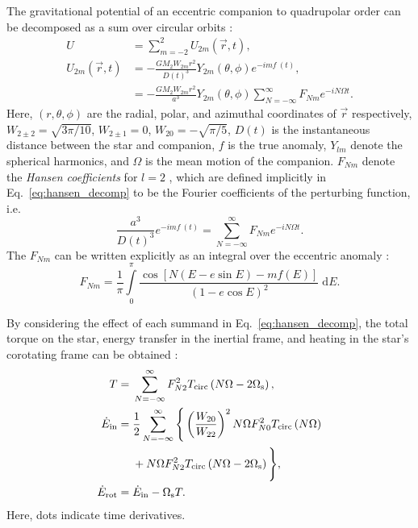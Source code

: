 \documentclass[
        fleqn,
        usenatbib,
    ]{mnras}
\newcommand*{\p}[1]{\left(#1\right)}
\newcommand*{\s}[1]{\left[#1\right]}
\begin{document}
The gravitational potential of an eccentric companion to quadrupolar order can
be decomposed as a sum over circular orbits \citep[e.g.][]{sl,vlf}:
\begin{align}
    U &= \sum\limits_{m=-2}^2 U_{2m} \p{\vec{r}, t},\label{eq:u_ecc}\\
    U_{2m}\p{\vec{r}, t} &= -\frac{GM_2 W_{2m} r^2}{D(t)^3}
        Y_{2m}(\theta, \phi) e^{-imf\!\!\!\:(t)},\nonumber\\
        &= -\frac{GM_2W_{2m} r^2}{a^3}Y_{2m}\p{\theta, \phi}
            \sum\limits_{N = -\infty}^\infty \!\!F_{Nm}e^{-iN\Omega t}
            \label{eq:hansen_decomp}.
\end{align}
Here, $(r, \theta, \phi)$ are the radial, polar, and azimuthal coordinates of
$\vec{r}$ respectively, $W_{2 \pm 2} = \sqrt{3\pi/10}$, $W_{2 \pm 1} = 0$,
$W_{20} = -\sqrt{\pi / 5}$, $D(t)$ is the instantaneous distance between the
star and companion, $f$ is the true anomaly, $Y_{lm}$ denote the spherical
harmonics, and $\Omega$ is the mean motion of the companion. $F_{Nm}$ denote
the \emph{Hansen coefficients} for $l = 2$ \citep[also denoted $X^n_{2m}$
in][]{murray1999solar}, which are defined implicitly in
Eq.~\eqref{eq:hansen_decomp} to be the Fourier coefficients of the perturbing
function, i.e.
\begin{equation}
    \frac{a^3}{D(t)^3} e^{-imf\!\!\!\:(t)} = \sum\limits_{N = -\infty}^\infty
        \!\!F_{Nm} e^{-iN\Omega t}.\label{eq:hansen_series}
\end{equation}
The $F_{Nm}$ can be written explicitly as an integral over the eccentric anomaly
\citep{murray1999solar, sl}:
\begin{equation}
    F_{Nm} = \frac{1}{\pi}\int\limits_{0}^{\pi}
        \frac{\cos\s{N\p{E - e\sin E} - mf(E)}}
            {\p{1 - e\cos E}^2}\;\mathrm{d}E.\label{eq:hansen_integral}
\end{equation}

By considering the effect of each summand in Eq.~\eqref{eq:hansen_decomp}, the
total torque on the star, energy transfer in the inertial frame, and heating in
the star's corotating frame can be obtained \citep{sl, vlf}:
\begin{align}
    T ={}& \sum\limits_{N = -\infty}^\infty F_{N2}^2
        T_{\rm circ}\p{N\Omega - 2\Omega_{\rm s}},\label{eq:tau_sum}
        \\
    \dot{E}_{\rm in} ={}&
        \frac{1}{2}\sum\limits_{N = -\infty}^\infty\Bigg\{
            \p{\frac{W_{20}}{W_{22}}}^2 N\Omega F_{N0}^2 T_{\rm circ}\p{N\Omega}
                \nonumber\\
            &+ N\Omega F_{N2}^2 T_{\rm circ}\p{N\Omega - 2\Omega_{\rm s}}
            \Bigg\},\label{eq:edot_in}\\
    \dot{E}_{\rm rot} ={}& \dot{E}_{\rm in} - \Omega_{\rm s} T
        \label{eq:edot_rot}.
\end{align}
Here, dots indicate time derivatives.
\end{document}

